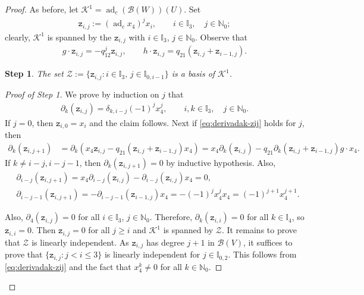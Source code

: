 \documentclass[10pt,a4paper]{amsart}
\numberwithin{equation}{section}
\newtheorem{step}{Step}
\newcommand{\adc}{\operatorname{ad}_c}
\newcommand{\toba}{\mathscr B}
\newcommand{\K}{{\mathcal{K}}}
\newcommand{\Zc}{{\mathcal{Z}}}
\newcommand{\I}{{\mathbb I}}
\newcommand{\N}{{\mathbb N}}
\newcommand{\zc}[2]{\mathtt{z}_{#1,#2}}
\begin{document}
\begin{proof}
As before, let $\K^1 =\adc(\toba(W))(U)$.
Set
\begin{align*}%
\zc{i}{j} := (\adc x_{4})^j x_i,\qquad i\in\I_3, \quad j\in\N_0;
\end{align*}
clearly, $\K^1$ is spanned by the $\zc{i}{j}$ with $i\in\I_3$, $ j\in\N_0$. Observe that
\begin{align*}
g\cdot \zc{i}{j} = -q_{12}^j\zc{i}{j}, \qquad
h\cdot \zc{i}{j} = q_{21}(\zc{i}{j}+\zc{i-1}{j}).
\end{align*}

\begin{step}%
The set $\Zc := \{\zc{i}{j}\colon i\in\I_3, \, j\in\I_{0,i-1}\}$ is a basis of $\K^1$.
\end{step}

\begin{proof}[Proof of Step 1]
We prove by induction on $j$ that
\begin{align}\label{eq:derivadak-zij}
\partial_k(\zc{i}{j}) = \delta_{k,i-j} (-1)^j x_{4}^{j}, \qquad i,k\in\I_3, \quad j\in\N_0.
\end{align}
If $j=0$, then $\zc{i}{0}=x_i$ and the claim follows. Next if \eqref{eq:derivadak-zij} holds for $j$, then
\begin{align*}
\partial_k(\zc{i}{j+1})&=\partial_k(x_{4}\zc{i}{j}-q_{21}(\zc{i}{j}+\zc{i-1}{j})x_{4})
=x_{4}\partial_k(\zc{i}{j})-q_{21}\partial_k(\zc{i}{j}+\zc{i-1}{j})g\cdot x_{4}.
\end{align*}
If $k\ne i-j,i-j-1$, then $\partial_k(\zc{i}{j+1})=0$ by inductive hypothesis. Also,
\begin{align*}
&\partial_{i-j}(\zc{i}{j+1})=x_{4}\partial_{i-j}(\zc{i}{j})-\partial_{i-j}(\zc{i}{j})x_{4}=0,
\\
&\partial_{i-j-1}(\zc{i}{j+1})=-\partial_{i-j-1}(\zc{i-1}{j})x_{4}=-(-1)^j x_{4}^{j}x_{4}
=(-1)^{j+1} x_{4}^{j+1}.
\end{align*}

Also, $\partial_{4}(\zc{i}{j})=0$ for all $i\in\I_3$, $j\in\N_0$. Therefore, $\partial_k(\zc{i}{i})=0$ for all $k\in\I_{4}$, so $\zc{i}{i}=0$. Then $\zc{i}{j}=0$ for all $j\ge i$ and $\K^1$ is spanned by $\Zc$.
It remains to prove that $\Zc$ is linearly independent. As $\zc{i}{j}$ has degree $j+1$ in $\toba(V)$, it suffices to prove that $\{\zc{i}{j}\colon j<i\le 3\}$ is linearly independent for $j\in\I_{0,2}$. This follows from \eqref{eq:derivadak-zij} and the fact that $x_{4}^k\ne 0$ for all $k\in\N_0$.
\end{proof}


\end{proof}
\end{document}
